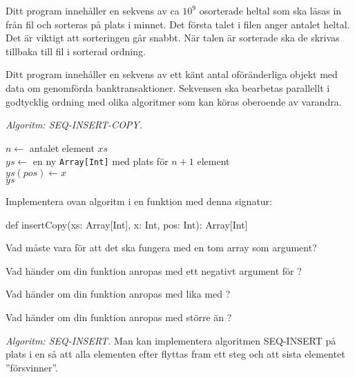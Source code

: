 \Subtask Ditt program innehåller en sekvens av ca $10^9$ osorterade heltal som ska läsas in från fil och sorteras på plats i minnet. Det första talet i filen anger antalet heltal. Det är viktigt att sorteringen går snabbt. När talen är sorterade ska de skrivas tillbaka till fil i sorterad ordning. 		
		
\Subtask Ditt program innehåller en sekvens av ett känt antal oföränderliga objekt med data om genomförda banktransaktioner. Sekvensen ska bearbetas parallellt i godtycklig ordning med olika algoritmer som kan köras oberoende av varandra.
 
 
\ExtraTasks %

\Task \emph{Algoritm: SEQ-INSERT-COPY.} 

\begin{algorithm}[H]
 
 $n \leftarrow$ antalet element $xs$\\ 
 $ys \leftarrow$ en ny \texttt{Array[Int]} med plats för $n+1$ element \\
 $ys(pos) \leftarrow x$ \\
 \Return $ys$ 
\end{algorithm}

\Subtask Implementera ovan algoritm i en funktion med denna signatur:
\begin{Code}
def insertCopy(xs: Array[Int], x: Int, pos: Int): Array[Int]
\end{Code}

\Subtask Vad måste  vara för att det ska fungera med en tom array som argument?

\Subtask Vad händer om din funktion anropas med ett negativt argument för ?

\Subtask Vad händer om din funktion anropas med  lika med ?

\Subtask Vad händer om din funktion anropas med  större än ?



\Task \emph{Algoritm: SEQ-INSERT.} Man kan implementera algoritmen SEQ-INSERT på plats i en  så att alla elementen efter  flyttas fram ett steg och att sista elementet ''försvinner''.

